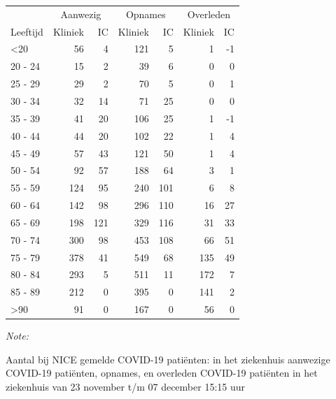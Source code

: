 \documentclass[
  english,
  man,floatsintext]{apa6}
\begin{document}
\begin{table}
\centering\begingroup\fontsize{10}{12}\selectfont

\begin{threeparttable}
\begin{tabular}{lrrrrrr}
\toprule
\multicolumn{1}{c}{ } & \multicolumn{2}{c}{Aanwezig} & \multicolumn{2}{c}{Opnames} & \multicolumn{2}{c}{Overleden} \\
\cmidrule(l{3pt}r{3pt}){2-3} \cmidrule(l{3pt}r{3pt}){4-5} \cmidrule(l{3pt}r{3pt}){6-7}
Leeftijd & Kliniek & IC & Kliniek & IC & Kliniek & IC\\
\midrule
<20 & 56 & 4 & 121 & 5 & 1 & -1\\
20 - 24 & 15 & 2 & 39 & 6 & 0 & 0\\
25 - 29 & 29 & 2 & 70 & 5 & 0 & 1\\
30 - 34 & 32 & 14 & 71 & 25 & 0 & 0\\
35 - 39 & 41 & 20 & 106 & 25 & 1 & -1\\
40 - 44 & 44 & 20 & 102 & 22 & 1 & 4\\
45 - 49 & 57 & 43 & 121 & 50 & 1 & 4\\
50 - 54 & 92 & 57 & 188 & 64 & 3 & 1\\
55 - 59 & 124 & 95 & 240 & 101 & 6 & 8\\
60 - 64 & 142 & 98 & 296 & 110 & 16 & 27\\
65 - 69 & 198 & 121 & 329 & 116 & 31 & 33\\
70 - 74 & 300 & 98 & 453 & 108 & 66 & 51\\
75 - 79 & 378 & 41 & 549 & 68 & 135 & 49\\
80 - 84 & 293 & 5 & 511 & 11 & 172 & 7\\
85 - 89 & 212 & 0 & 395 & 0 & 141 & 2\\
>90 & 91 & 0 & 167 & 0 & 56 & 0\\
\bottomrule
\end{tabular}
\begin{tablenotes}
\item \textit{Note: } 
\item Aantal bij NICE gemelde COVID-19 patiënten: in het ziekenhuis aanwezige COVID-19 patiënten, opnames, en overleden COVID-19 patiënten in het ziekenhuis van 23 november t/m 07 december 15:15 uur
\end{tablenotes}
\end{threeparttable}
\endgroup{}
\end{table}

\newpage
\end{document}

